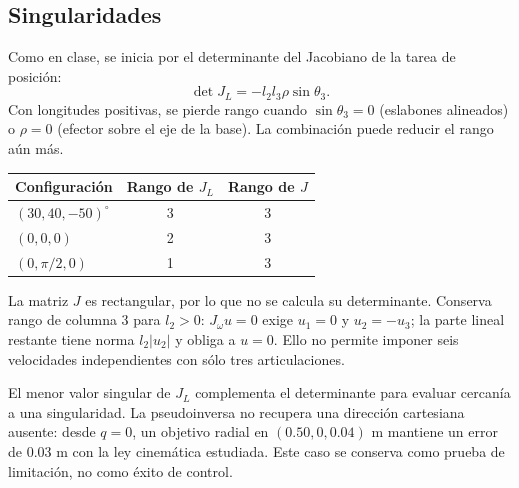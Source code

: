 \subsection{Singularidades}
Como en clase, se inicia por el determinante del Jacobiano de la tarea de posición:
\begin{equation}
\det J_L=-l_2l_3\rho\sin\theta_3.
\end{equation}
Con longitudes positivas, se pierde rango cuando $\sin\theta_3=0$ (eslabones alineados) o $\rho=0$ (efector sobre el eje de la base). La combinación puede reducir el rango aún más.
\begin{center}\begin{tabular}{lcc}\toprule
Configuración & Rango de $J_L$ & Rango de $J$\\\midrule
$(30,40,-50)^\circ$ & 3 & 3\\
$(0,0,0)$ & 2 & 3\\
$(0,\pi/2,0)$ & 1 & 3\\\bottomrule\end{tabular}\end{center}
La matriz $J$ es rectangular, por lo que no se calcula su determinante. Conserva rango de columna 3 para $l_2>0$: $J_\omega u=0$ exige $u_1=0$ y $u_2=-u_3$; la parte lineal restante tiene norma $l_2|u_2|$ y obliga a $u=0$. Ello no permite imponer seis velocidades independientes con sólo tres articulaciones.

El menor valor singular de $J_L$ complementa el determinante para evaluar cercanía a una singularidad. La pseudoinversa no recupera una dirección cartesiana ausente: desde $q=0$, un objetivo radial en $(0.50,0,0.04)$ m mantiene un error de 0.03 m con la ley cinemática estudiada. Este caso se conserva como prueba de limitación, no como éxito de control.
